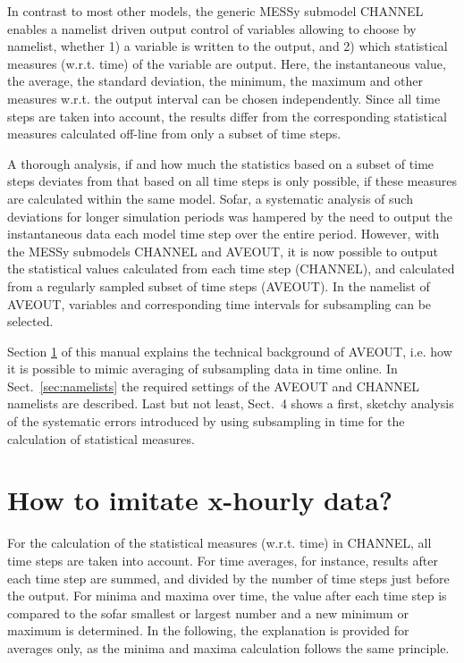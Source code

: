 \documentclass[twoside]{article}
\begin{document}
In contrast to most other models, the generic MESSy submodel
CHANNEL enables a namelist driven output control of variables allowing to
choose by namelist, whether 1) a variable is written to the output, and 2) which
statistical measures (w.r.t. time) of the variable are output.
Here, the instantaneous value, the average, the standard
deviation, the minimum, the maximum and other measures w.r.t. the output
interval can be chosen independently. Since all time steps are taken into
account, the results differ from the corresponding statistical measures
calculated off-line from only a subset of time steps.

A thorough analysis, if and how much the statistics based on a subset of
time steps deviates from that based on all time steps is only possible,
if these measures are calculated within the same model. Sofar, a systematic
analysis of such deviations for longer simulation periods was hampered by the
need to output the instantaneous data each model time step over the entire
period.
However, with the MESSy submodels CHANNEL and AVEOUT, it is now possible to
output the statistical values calculated from each time step (CHANNEL),
and calculated from a regularly sampled subset of time steps (AVEOUT).
In the namelist of AVEOUT, variables and corresponding time intervals for
subsampling can be selected.

Section \ref{sec:idea} of this manual explains the technical background of
AVEOUT, i.e. how it is possible to mimic averaging of subsampling data in
time online. In Sect.\ \ref{sec:namelists} the required settings of the AVEOUT
and CHANNEL namelists are described. Last but not least, Sect.\ 4 shows a
first, sketchy analysis of the systematic errors introduced by using
subsampling in time for the calculation of statistical measures.

\section{How to imitate x-hourly data?}
\label{sec:idea}
For the calculation of the statistical measures (w.r.t. time) in CHANNEL, all
time steps are taken into account. For time averages, for instance, results
after each time step are summed, and divided by the number of time steps just
before the output. For minima and maxima over time, the value after each time
step is compared to the sofar smallest or largest number and a new minimum or
maximum is determined. In the following, the explanation is provided for
averages only, as the minima and maxima calculation follows the same principle.
\end{document}
